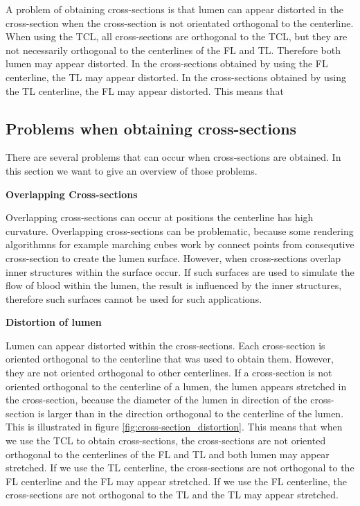 \documentclass[thesis.tex]{subfiles}
\begin{document}
A problem of obtaining cross-sections is that lumen can appear distorted in the cross-section when the cross-section is not orientated orthogonal to the centerline. When using the TCL, all cross-sections are orthogonal to the TCL, but they are not necessarily orthogonal to the centerlines of the FL and TL. Therefore both lumen may appear distorted. In the cross-sections obtained by using the FL centerline, the TL may appear distorted. 
In the cross-sections obtained by using the TL centerline, the FL may appear distorted. This means that 
\subsection{Problems when obtaining cross-sections}
There are several problems that can occur when cross-sections are obtained. In this section we want to give an overview of those problems. 

\textbf{Overlapping Cross-sections} 

Overlapping cross-sections can occur at positions the centerline has high curvature. Overlapping cross-sections can be problematic, because some rendering algorithmns for example marching cubes work by connect points from consequtive cross-section to create the lumen surface. However, when cross-sections overlap inner structures within the surface occur. If such surfaces are used to simulate the flow of blood within the lumen, the result is influenced by the inner structures, therefore such surfaces cannot be used for such applications.

\textbf{Distortion of lumen} 

Lumen can appear distorted within the cross-sections. Each cross-section is oriented orthogonal to the centerline that was used to obtain them. However, they are not oriented orthogonal to other centerlines. If a cross-section is not oriented orthogonal to the centerline of a lumen, the lumen appears stretched in the cross-section, because the diameter of the lumen in direction of the cross-section is larger than in the direction orthogonal to the centerline of the lumen. This is illustrated in figure \ref{fig:cross-section_distortion}. This means that when we use the TCL to obtain cross-sections, the cross-sections are not oriented orthogonal to the centerlines of the FL and TL and both lumen may appear stretched. If we use the TL centerline, the cross-sections are not orthogonal to the FL centerline and the FL may appear stretched. If we use the FL centerline, the cross-sections are not orthogonal to the TL and the TL may appear stretched.  
\end{document}
